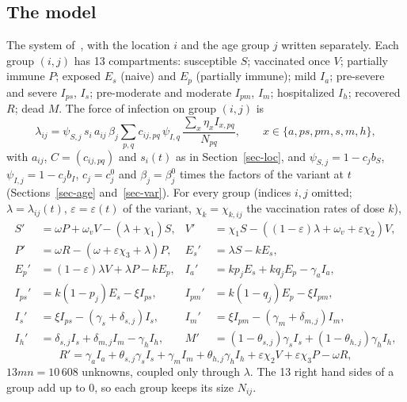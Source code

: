 \documentclass[11pt]{article}
\theoremstyle{remark}
\begin{document}
\subsection{The model}\label{sec-model}

The system of~\cite[Section~2.1 and Fig.~1]{2026Feng_Day_Glasser}, with the
location $i$ and the age group $j$ written separately. Each group $(i,j)$ has
13 compartments: susceptible $S$; vaccinated once $V$; partially immune $P$;
exposed $E_s$ (naive) and $E_p$ (partially immune); mild $I_a$; pre-severe and
severe $I_{ps}$, $I_s$; pre-moderate and moderate $I_{pm}$, $I_m$; hospitalized
$I_h$; recovered $R$; dead $M$. The force of infection on group $(i,j)$ is
\begin{equation}\label{lambda}
\lambda_{ij}=\psi_{S,j}\,s_i\,a_{ij}\,\beta_j\sum_{p,q}c_{ij,pq}\,\psi_{I,q}\,
\frac{\sum_x\eta_xI_{x,pq}}{N_{pq}},\qquad x\in\{a,ps,pm,s,m,h\},
\end{equation}
with $a_{ij}$, $C=(c_{ij,pq})$ and $s_i(t)$ as in Section~\ref{sec-loc}, and $\psi_{S,j}=1-c_jb_S$, $\psi_{I,j}=1-c_jb_I$,
$c_j=c_j^0$ and $\beta_j=\beta_j^0$ times the factors of the variant at $t$
(Sections~\ref{sec-age} and~\ref{sec-var}). For every group (indices $i,j$
omitted; $\lambda=\lambda_{ij}(t)$, $\varepsilon=\varepsilon(t)$ of the variant,
$\chi_k=\chi_{k,ij}$ the vaccination rates of dose $k$),
\begin{equation}\label{ode}
\begin{aligned}
S'&=\omega P+\omega_vV-(\lambda+\chi_1)S, &
V'&=\chi_1S-\left((1-\varepsilon)\lambda+\omega_v+\varepsilon\chi_2\right)V,\\
P'&=\omega R-(\omega+\varepsilon\chi_3+\lambda)P, &
E_s'&=\lambda S-kE_s,\\
E_p'&=(1-\varepsilon)\lambda V+\lambda P-kE_p, &
I_a'&=kp_jE_s+kq_jE_p-\gamma_aI_a,\\
I_{ps}'&=k(1-p_j)E_s-\xi I_{ps}, &
I_{pm}'&=k(1-q_j)E_p-\xi I_{pm},\\
I_s'&=\xi I_{ps}-(\gamma_s+\delta_{s,j})I_s, &
I_m'&=\xi I_{pm}-(\gamma_m+\delta_{m,j})I_m,\\
I_h'&=\delta_{s,j}I_s+\delta_{m,j}I_m-\gamma_hI_h, &
M'&=(1-\theta_{s,j})\gamma_sI_s+(1-\theta_{h,j})\gamma_hI_h,
\end{aligned}
\end{equation}
\begin{equation*}
R'=\gamma_aI_a+\theta_{s,j}\gamma_sI_s+\gamma_mI_m+\theta_{h,j}\gamma_hI_h
+\varepsilon\chi_2V+\varepsilon\chi_3P-\omega R,
\end{equation*}
$13mn=10\,608$ unknowns, coupled only through $\lambda$. The 13 right hand sides
of a group add up to $0$, so each group keeps its size $N_{ij}$.
\end{document}

